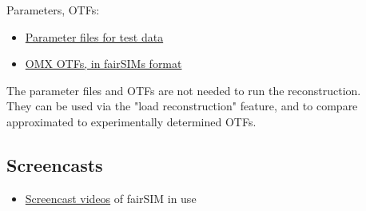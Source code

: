 \documentclass[twoside=false,
           a4paper,
           10pt,DIV=16]{article}
\begin{document}

Parameters, OTFs:\\
\begin{itemize}
\item \href{fairSIM-parameters.zip}{Parameter files for test data}
\item \href{OMX-OTFs.zip}{OMX OTFs, in fairSIMs format}
\end{itemize}
The parameter files and OTFs are not needed to run the reconstruction.\\
They can be used via the "load reconstruction" feature, and to
compare approximated to experimentally determined OTFs.

\subsection*{Screencasts}

\begin{itemize}
\item
\href{./screencasts/}
{Screencast videos} of fairSIM in use
\end{itemize}
\end{document}
